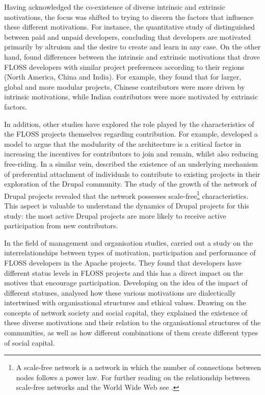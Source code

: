 Having acknowledged the co-existence of diverse intrinsic and extrinsic motivations, the focus was shifted to trying to discern the factors that influence these different motivations. For instance, the quantitative study of \textcite{baytiyeh2010open} distinguished between paid and unpaid developers, concluding that developers are motivated primarily by altruism and the desire to create and learn in any case. On the other hand, \textcite{subramanyam2008free} found differences between the intrinsic and extrinsic motivations that drove FLOSS developers with similar project preferences according to their regions (North  America,  China  and  India). For example, they found that for larger, global and more modular projects, Chinese contributors were more driven by intrinsic motivations, while Indian contributors were more motivated by extrinsic factors.

In addition, other studies have explored the role played by the characteristics of the FLOSS projects themselves regarding contribution. For example, \textcite{Baldwin2006} developed a model to argue that the modularity of the architecture is a critical factor in increasing the incentives for contributors to join and remain, whilst also reducing free-riding. In a similar vein, \textcite{Huang2011} described the existence of an underlying mechanism of preferential attachment \parencite{barabasi2000scale} of individuals to contribute to existing projects in their exploration of the Drupal community. The study of the growth of the network of Drupal projects revealed that the network possesses scale-free\footnote{A scale-free network is a network in which the number of connections between nodes follows a power law. For further reading on the relationship between scale-free networks and the World Wide Web see \textcite{barabasi2000scale}.} characteristics. This aspect is valuable to understand the dynamics of Drupal projects for this study: the most active Drupal projects are more likely to receive active participation from new contributors.

In the field of management and organisation studies, \textcite{Roberts2006} carried out a study on the interrelationships between types of motivation, participation and performance of FLOSS developers in the Apache projects. They found that developers have different status levels in FLOSS projects and this has a direct impact on the motives that encourage participation. Developing on the idea of the impact of different statuses, \textcite{kolarec2013social} analysed how these various motivations are dialectically intertwined with organisational structures and ethical values. Drawing on the concepts of network society \parencite{castells2011rise} and social capital, they explained the existence of these diverse motivations and their relation to the organisational structures of the communities, as well as how different combinations of them create different types of social capital.

